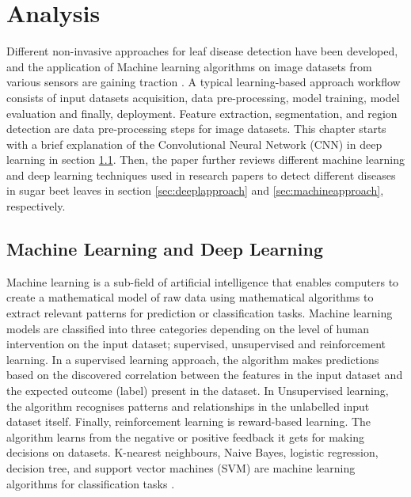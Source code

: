 \chapter{Analysis}\label{cha:Analysis}

Different non-invasive approaches for leaf disease detection have been developed, and the application of Machine learning algorithms on image datasets from various sensors are gaining traction \cite{ferentinos2018deep, ahmed2019rice, annabel2019machine, ramesh2018plant}. A typical learning-based approach workflow consists of input datasets acquisition, data pre-processing, model training, model evaluation and finally, deployment. Feature extraction, segmentation, and region detection are data pre-processing steps for image datasets. This chapter starts with a brief explanation of the Convolutional Neural Network (CNN) in deep learning in section \ref{sec:machinedeep}. Then, the paper further reviews different machine learning and deep learning techniques used in research papers to detect different diseases in sugar beet leaves in section \ref{sec:deeplapproach} and \ref{sec:machineapproach}, respectively.

\section{Machine Learning and Deep Learning}\label{sec:machinedeep}
Machine learning is a sub-field of artificial intelligence that enables computers to create a mathematical model of raw data using mathematical algorithms to extract relevant patterns for prediction or classification tasks. Machine learning models are classified into three categories depending on the level of human intervention on the input dataset; supervised, unsupervised and reinforcement learning. In a supervised learning approach, the algorithm makes predictions based on the discovered correlation between the features in the input dataset and the expected outcome (label) present in the dataset. In Unsupervised learning, the algorithm recognises patterns and relationships in the unlabelled input dataset itself. Finally, reinforcement learning is reward-based learning. The algorithm learns from the negative or positive feedback it gets for making decisions on datasets. K-nearest neighbours, Naive Bayes, logistic regression, decision tree, and support vector machines (SVM) are machine learning algorithms for classification tasks \cite{goodfellow2016deep}.

